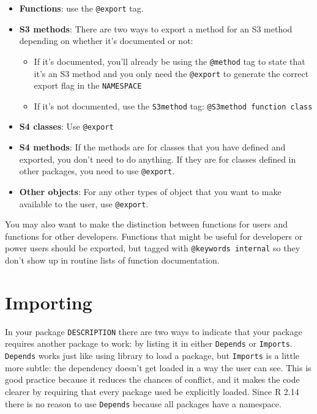 \begin{itemize}
\item
  \textbf{Functions}: use the \texttt{@export} tag.
\item
  \textbf{S3 methods}: There are two ways to export a method for an S3
  method depending on whether it's documented or not:

  \begin{itemize}
  \item
    If it's documented, you'll already be using the \texttt{@method} tag
    to state that it's an S3 method and you only need the
    \texttt{@export} to generate the correct export flag in the
    \texttt{NAMESPACE}
  \item
    If it's not documented, use the \texttt{S3method} tag:
    \texttt{@S3method function class}
  \end{itemize}
\item
  \textbf{S4 classes}: Use \texttt{@export}
\item
  \textbf{S4 methods}: If the methods are for classes that you have
  defined and exported, you don't need to do anything. If they are for
  classes defined in other packages, you need to use \texttt{@export}.
\item
  \textbf{Other objects}: For any other types of object that you want to
  make available to the user, use \texttt{@export}.
\end{itemize}

You may also want to make the distinction between functions for users
and functions for other developers. Functions that might be useful for
developers or power users should be exported, but tagged with
\texttt{@keywords internal} so they don't show up in routine lists of
function documentation.

\section{Importing}

In your package \texttt{DESCRIPTION} there are two ways to indicate that
your package requires another package to work: by listing it in either
\texttt{Depends} or \texttt{Imports}. \texttt{Depends} works just like
using library to load a package, but \texttt{Imports} is a little more
subtle: the dependency doesn't get loaded in a way the user can see.
This is good practice because it reduces the chances of conflict, and it
makes the code clearer by requiring that every package used be
explicitly loaded. Since R 2.14 there is no reason to use
\texttt{Depends} because all packages have a namespace.

